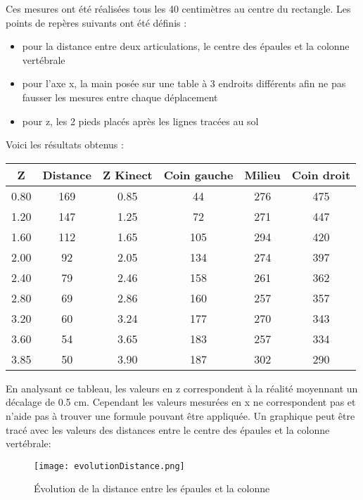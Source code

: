 Ces mesures ont été réalisées tous les 40 centimètres au centre du rectangle. Les points de repères suivants ont été définis :
\begin{itemize}
\item pour la distance entre deux articulations, le centre des épaules et la colonne vertébrale
\item pour l'axe x, la main posée sur une table à 3 endroits différents afin ne pas fausser les mesures entre chaque déplacement
\item pour z, les 2 pieds placés après les lignes tracées au sol \\

\end{itemize}

Voici les résultats obtenus : 
\begin{center}
	\begin{tabular}{|*{6}{c|}}
	\hline
		\textbf{Z} & \textbf{Distance} & \textbf{Z Kinect} & \textbf{Coin gauche} & \textbf{Milieu} & \textbf{Coin droit}  \\ \hline
		0.80 & 169 & 0.85 & 44 & 276 & 475\\ \hline
		1.20 & 147 & 1.25 & 72 & 271 & 447\\ \hline
		1.60 & 112 & 1.65 & 105 & 294 & 420\\ \hline
		2.00 & 92 & 2.05 & 134 & 274 & 397\\ \hline
		2.40 & 79 & 2.46 & 158 & 261 & 362\\ \hline
		2.80 & 69 & 2.86 & 160 & 257 & 357\\ \hline
		3.20 & 60 & 3.24 & 177 & 270 & 343\\ \hline
		3.60 & 54 & 3.65 & 183 & 257 & 334\\ \hline
		3.85 & 50 & 3.90 & 187 & 302 & 290\\ \hline
	\end{tabular}
\end{center}

En analysant ce tableau, les valeurs en z correspondent à la réalité moyennant un décalage de 0.5 cm. Cependant les valeurs mesurées en x ne correspondent pas et n'aide pas à trouver une formule pouvant être appliquée. Un graphique peut être tracé avec les valeurs des distances entre le centre des épaules et la colonne vertébrale: \\

\begin{figure}[H]
	\centering
		\texttt{[image: evolutionDistance.png]}
	\caption{\label{evolutionDistance} Évolution de la distance entre les épaules et la colonne}
\end{figure}

